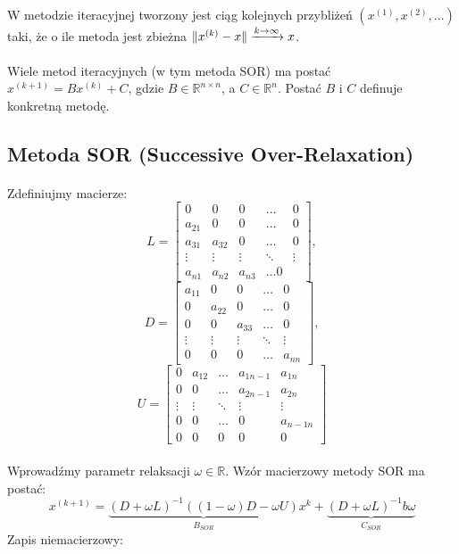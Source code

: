 \documentclass{article}
\DeclarePairedDelimiter{\norm}{\lVert}{\rVert}
\begin{document}
\paragraph{}
W metodzie iteracyjnej tworzony jest ciąg kolejnych przybliżeń 
\((x^{(1)}, x^{(2)},\dots)\)
taki, że o ile metoda jest zbieżna \(
\norm{x^{(k)}-x}\xrightarrow{k\rightarrow\infty}x
\).
\paragraph{}
Wiele metod iteracyjnych (w tym metoda SOR) ma postać \\ \(x^{(k+1)}=Bx^{(k)}+C\), gdzie \(B\in \mathbb{R}^{n\times n}\), a \(C\in\mathbb{R}^{n}\). Postać $B$ i $C$ definuje konkretną metodę.
\subsection {Metoda SOR (Successive Over-Relaxation)}
\paragraph{}
Zdefiniujmy macierze:
\[
L = \begin{bmatrix}
  0 & 0 & 0 & \dots &0\\
  a_{21} &0 & 0 & \dots & 0\\
  a_{31} & a_{32} &0  & \dots & 0\\
 \vdots & \vdots &\vdots & \ddots & \vdots \\
  a_{n1} & a_{n2} &a_{n3} & \dots 0
\end{bmatrix},\]
\[
D = \begin{bmatrix}
  a_{11} & 0 & 0 & \dots &0\\
  0 & a_{22} & 0 & \dots & 0\\
  0 & 0  & a_{33} & \dots & 0\\
 \vdots & \vdots &\vdots & \ddots & \vdots \\
  0 & 0 & 0 & \dots & a_{nn}
\end{bmatrix},\]
\[
U = \begin{bmatrix}
  0 & a_{12} & \dots & a_{1n-1} & a_{1n} \\
  0 & 0 & \dots &  a_{2n-1} & a_{2n}\\
 \vdots & \vdots &\ddots & \vdots & \vdots \\
  0 & 0  &\dots &  0 & a_{n-1n}\\
  0 & 0 & 0 & 0 & 0
\end{bmatrix}
 \]
\paragraph{}
Wprowadźmy parametr relaksacji $\omega \in \mathbb{R}$.
Wzór macierzowy metody SOR ma postać:
\[
x^{(k+1)}=\underbrace{(D+\omega L)^{-1}((1-\omega)D-\omega U)}_{B_{SOR}}x^k + \underbrace{(D+ \omega L)^{-1}b\omega}_{C_{SOR}}
\]
Zapis niemacierzowy:
\begin{algorithmic}
\end{algorithmic}
\end{document}
